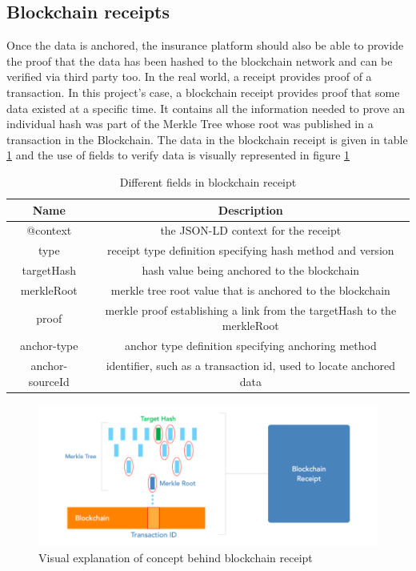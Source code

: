 \subsection{Blockchain receipts}
Once the data is anchored, the insurance platform should also be able to provide the proof that the data has been hashed to the blockchain network and can be verified via third party too. In the real world, a receipt provides proof of a transaction. In this project's case, a blockchain receipt provides proof that some data existed at a specific time. It contains all the information needed to prove an individual hash was part of the Merkle Tree whose root was published in a transaction in the Blockchain. The data in the blockchain receipt is given in table \ref{table:receipt} and the use of fields to verify data is visually represented in figure \ref{fig:merkle}
\begin{table}[h!]
\centering
\begin{tabular}{||c c||} 
\hline
Name & Description  \\ [0.5ex] 
\hline\hline
@context & the JSON-LD context for the receipt \\ 
\hline
type & receipt type definition specifying hash method and version \\
\hline
targetHash & hash value being anchored to the blockchain \\
\hline
merkleRoot	& merkle tree root value that is anchored to the blockchain \\
\hline
proof	& merkle proof establishing a link from the targetHash to the merkleRoot \\
\hline
anchor-type	& anchor type definition specifying anchoring method \\
\hline
anchor-sourceId &	identifier, such as a transaction id, used to locate anchored data \\ [1ex]
 \hline
\end{tabular}
\caption{Different fields in blockchain receipt}
\label{table:receipt}
\end{table}

\begin{figure}[ht]
    \centering
    \includegraphics[width=\textwidth]{Figures/Merkle.png}
    \caption{Visual explanation of concept behind blockchain receipt\cite{Wayne2016Chainpoint:Receipts}}
    \label{fig:merkle}
\end{figure}

